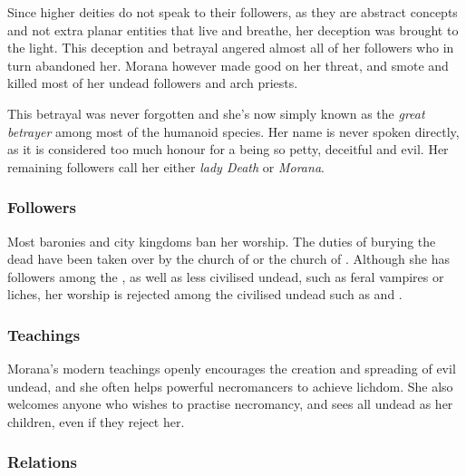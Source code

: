 Since higher deities do not speak to their followers, as they are abstract
concepts and not extra planar entities that live and breathe, her deception
was brought to the light. This deception and betrayal angered almost all of
her followers who in turn abandoned her. Morana however made good on her
threat, and smote and killed most of her undead followers and arch priests.

This betrayal was never forgotten and she's now simply known as the
\emph{great betrayer} among most of the humanoid species. Her name is never
spoken directly, as it is considered too much honour for a being so petty,
deceitful and evil. Her remaining followers call her either \emph{lady Death}
or \emph{Morana}.


\subsubsection{Followers}

Most baronies and city kingdoms ban her worship. The duties of burying the
dead have been taken over by the church of  or the church
of . Although she has followers among the ,
as well as less civilised undead, such as feral vampires or liches, her worship
is rejected among the civilised undead such as  and
.

\subsubsection{Teachings}

Morana's modern teachings openly encourages the creation and spreading of
evil undead, and she often helps powerful necromancers to achieve lichdom.
She also welcomes anyone who wishes to practise necromancy, and sees all
undead as her children, even if they reject her.

\subsubsection{Relations}

